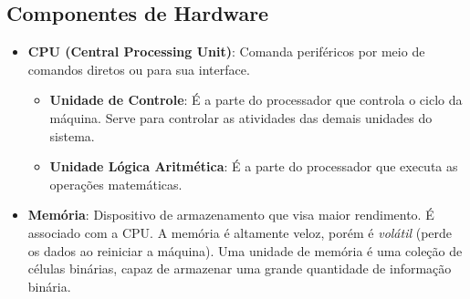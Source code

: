 \documentclass{article}
\begin{document}
\subsection*{\centering Componentes de Hardware}

\begin{itemize}
    \item \textbf{CPU (Central Processing Unit)}: Comanda periféricos 
        por meio de comandos diretos ou para sua interface.
    \begin{itemize}
        \item \textbf{Unidade de Controle}: É a parte do processador que controla o 
            ciclo da máquina. Serve para controlar as atividades das demais unidades
            do sistema.
        \item \textbf{Unidade Lógica Aritmética}: É a parte do processador que executa
            as operações matemáticas.
    \end{itemize}

    \item \textbf{Memória}: Dispositivo de armazenamento que visa maior rendimento.
        É associado com a CPU. A memória é altamente veloz, porém é \emph{volátil}
        (perde os dados ao reiniciar a máquina). Uma unidade de memória é uma coleção de células binárias,
        capaz de armazenar uma grande quantidade de informação binária.
\end{itemize}
\end{document}
